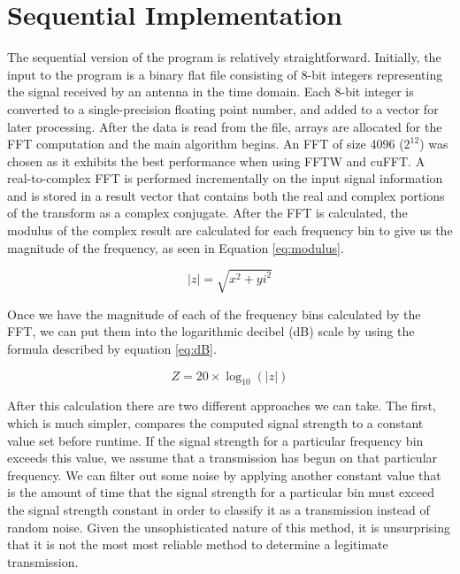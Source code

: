 \documentclass[conference]{IEEEtran}
\begin{document}
\section{Sequential Implementation}

The sequential version of the program is relatively straightforward. Initially,
the input to the program is a binary flat file consisting of 8-bit integers 
representing the signal received by an antenna in the time domain. Each 8-bit
integer is converted to a single-precision floating point number, and added
to a vector for later processing. After the data is read from the file, arrays
are allocated for the FFT computation and the main algorithm begins. An FFT of size
4096 ($2^{12}$) was chosen as it exhibits the best performance when using FFTW and cuFFT.
A real-to-complex FFT is performed incrementally on the input signal information
and is stored in a result vector that contains both the real and complex portions
of the transform as a complex conjugate. After the FFT is calculated, the modulus 
of the complex result are calculated for each frequency bin to give us the
magnitude of the frequency, as seen in Equation \ref{eq:modulus}.

\begin{equation}
|z|=\sqrt{ x^2 + yi^2 } \label{eq:modulus}
\end{equation}

Once we have the magnitude of each of the frequency bins calculated by the FFT,
we can put them into the logarithmic decibel (dB) scale by using the formula 
described by equation \ref{eq:dB}.

\begin{equation}
Z=20 \times \log_{10}(|z|) \label{eq:dB}
\end{equation}

After this calculation there are two different approaches we can take. The first,
which is much simpler, compares the computed signal strength to a constant value
set before runtime. If the signal strength for a particular frequency bin exceeds
this value, we assume that a transmission has begun on that particular frequency.
We can filter out some noise by applying another constant value that is the 
amount of time that the signal strength for a particular bin must exceed the 
signal strength constant in order to classify it as a transmission instead of 
random noise.
Given the unsophisticated nature of this method, it is unsurprising that it is not
the most most reliable method to determine a legitimate transmission.
\end{document}
